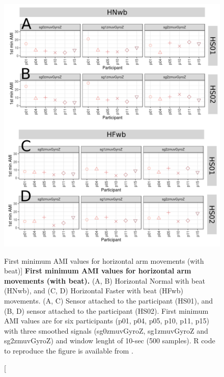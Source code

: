 \begin{figure}
\centering
\includegraphics[width=1.0\textwidth]{ami_Hwb_w10}
	\caption
	[First minimum AMI values for horizontal arm movements (with beat)]{
	{\bf First minimum AMI values for horizontal arm movements (with beat).}
		(A, B) Horizontal Normal with beat (HNwb), and 
		(C, D) Horizontal Faster with beat (HFwb) movements.
		(A, C) Sensor attached to the participant (HS01), and
		(B, D) sensor attached to the participant (HS02).
		First minimum AMI values are for six participants 
		(p01, p04, p05, p10, p11, p15) with three smoothed 
		signals (sg0zmuvGyroZ, sg1zmuvGyroZ and sg2zmuvGyroZ) and 
		window lenght of 10-sec (500 samples).
		R code to reproduce the figure is available 
		from \cite{hwum2018}.
        }
    \label{fig:amiHwb}
\end{figure}

